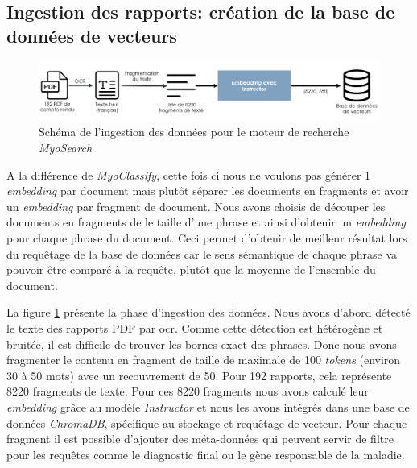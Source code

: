 \subsection{Ingestion des rapports: création de la base de données de vecteurs}
\begin{figure}[htbp]
 \centering
 \includegraphics[width=1\textwidth]{figures/myosearch_ingest.png}
 \caption[Ingestion des données dans \textit{MyoSearch}]{Schéma de l'ingestion des données pour le moteur de recherche \textit{MyoSearch}}
 \label{fig:myosearch_ingest}
\end{figure}

A la différence de \textit{MyoClassify}, cette fois ci nous ne voulons pas générer 1 \textit{embedding} par document mais plutôt séparer les documents en fragments et avoir un \textit{embedding} par fragment de document. Nous avons choisis de découper les documents en fragments de le taille d'une phrase et ainsi d'obtenir un \textit{embedding} pour chaque phrase du document. Ceci permet d'obtenir de meilleur résultat lors du requêtage de la base de données car le sens sémantique de chaque phrase va pouvoir être comparé à la requête, plutôt que la moyenne de l'ensemble du document.

La figure \ref{fig:myosearch_ingest} présente la phase d'ingestion des données. Nous avons d'abord détecté le texte des rapports PDF par \gls{ocr}. Comme cette détection est hétérogène et bruitée, il est difficile de trouver les bornes exact des phrases. Donc nous avons fragmenter le contenu en fragment de taille de maximale de 100 \textit{tokens} (environ 30 à 50 mots) avec un recouvrement de 50. Pour 192 rapports, cela représente 8220 fragments de texte. Pour ces 8220 fragments nous avons calculé leur \textit{embedding} grâce au modèle \textit{Instructor} et nous les avons intégrés dans une base de données \textit{ChromaDB}, spécifique au stockage et requêtage de vecteur. Pour chaque fragment il est possible d'ajouter des méta-données qui peuvent servir de filtre pour les requêtes comme le diagnostic final ou le gène responsable de la maladie.

